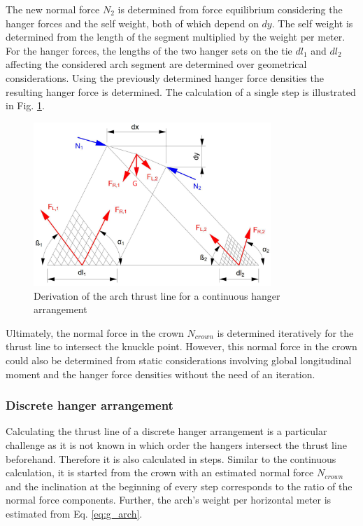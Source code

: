 The new normal force $N_2$ is determined from force equilibrium considering the hanger forces and the self weight, both of which depend on $dy$. The self weight is determined from the length of the segment multiplied by the weight per meter. For the hanger forces, the lengths of the two hanger sets on the tie $dl_1$ and $dl_2$ affecting the considered arch segment are determined over geometrical considerations. Using the previously determined hanger force densities the resulting hanger force is determined. The calculation of a single step is illustrated in Fig. \ref{fig:continuous_2}.
\begin{figure}[H]
    \centering
    \includegraphics[width=0.8\textwidth]{overleaf/Appendix/Pictures/continuous_thrust_line.PNG}
    \caption{Derivation of the arch thrust line for a continuous hanger arrangement}
    \label{fig:continuous_2}
\end{figure}

Ultimately, the normal force in the crown $N_{crown}$ is determined iteratively for the thrust line to intersect the knuckle point. However, this normal force in the crown could also be determined from static considerations involving global longitudinal moment and the hanger force densities without the need of an iteration.


\subsubsection{Discrete hanger arrangement}\label{app:discrete}

Calculating the thrust line of a discrete hanger arrangement is a particular challenge as it is not known in which order the hangers intersect the thrust line beforehand. Therefore it is also calculated in steps. Similar to the continuous calculation, it is started from the crown with an estimated normal force $N_{crown}$ and the inclination at the beginning of every step corresponds to the ratio of the normal force components. Further, the arch's weight per horizontal meter is estimated from Eq. \ref{eq:g_arch}.

